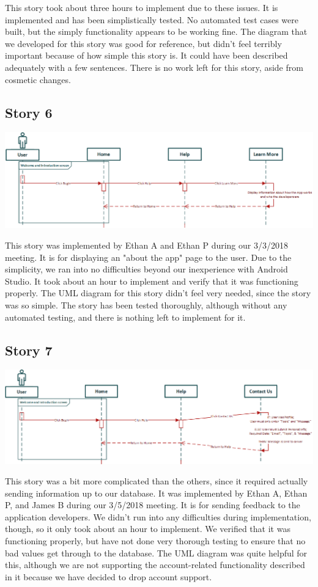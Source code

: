 \documentclass[a4paper]{article}
\begin{document}
This story took about three hours to implement due to these issues. It is implemented and has been simplistically tested. No automated test cases were built, but the simply functionality appears to be working fine. The diagram that we developed for this story was good for reference, but didn't feel terribly important because of how simple this story is. It could have been described adequately with a few sentences. There is no work left for this story, aside from cosmetic changes.
\subsection{Story 6}
\begin{center}\includegraphics[scale=.66]{Story6.eps}\end{center}
This story was implemented by Ethan A and Ethan P during our 3/3/2018 meeting. It is for displaying an "about the app" page to the user. Due to the simplicity, we ran into no difficulties beyond our inexperience with Android Studio. It took about an hour to implement and verify that it was functioning properly. The UML diagram for this story didn't feel very needed, since the story was so simple. The story has been tested thoroughly, although without any automated testing, and there is nothing left to implement for it. 
\pagebreak
\subsection{Story 7}
\begin{center}\includegraphics[scale=.66]{Story7.eps}\end{center}
This story was a bit more complicated than the others, since it required actually sending information up to our database. It was implemented by Ethan A, Ethan P, and James B during our 3/5/2018 meeting. It is for sending feedback to the application developers. We didn't run into any difficulties during implementation, though, so it only took about an hour to implement. We verified that it was functioning properly, but have not done very thorough testing to ensure that no bad values get through to the database. The UML diagram was quite helpful for this, although we are not supporting the account-related functionality described in it because we have decided to drop account support.
\end{document}
